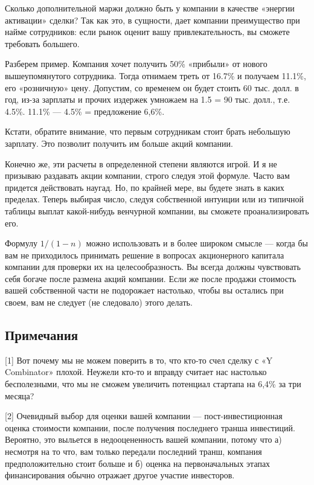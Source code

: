 \documentclass[ebook,12pt,oneside,openany]{memoir}
\begin{document}
Сколько дополнительной маржи должно быть у компании в качестве
«энергии активации» сделки? Так как это, в сущности, дает компании
преимущество при найме сотрудников: если рынок оценит вашу
привлекательность, вы сможете требовать большего. \newline

Разберем пример. Компания хочет получить 50\% «прибыли» от нового
вышеупомянутого сотрудника. Тогда отнимаем треть от 16.7\% и получаем
11.1\%, его «розничную» цену. Допустим, со временем он будет стоить 60
тыс. долл. в год, из-за зарплаты и прочих издержек умножаем на 1.5 =
90 тыс. долл., т.е. 4.5\%. 11.1\% — 4.5\% = предложение 6,6\%. \newline

Кстати, обратите внимание, что первым сотрудникам стоит брать
небольшую зарплату. Это позволит получить им больше акций компании. \newline

Конечно же, эти расчеты в определенной степени являются игрой. И я не
призываю раздавать акции компании, строго следуя этой формуле. Часто
вам придется действовать наугад. Но, по крайней мере, вы будете знать
в каких пределах. Теперь выбирая число, следуя собственной интуиции
или из типичной таблицы выплат какой-нибудь венчурной компании, вы
сможете проанализировать его. \newline

Формулу $1/(1 - n)$ можно использовать и в более широком смысле — когда
бы вам не приходилось принимать решение в вопросах акционерного
капитала компании для проверки их на целесообразность. Вы всегда
должны чувствовать себя богаче после размена акций компании. Если же
после продажи стоимость вашей собственной части не подорожает
настолько, чтобы вы остались при своем, вам не следует (не следовало)
этого делать.

\subsection{Примечания}

[1] Вот почему мы не можем поверить в то, что кто-то счел сделку с «Y
Combinator» плохой. Неужели кто-то и вправду считает нас настолько
бесполезными, что мы не сможем увеличить потенциал стартапа на 6,4\%
за три месяца? \newline

[2] Очевидный выбор для оценки вашей компании — пост-инвестиционная
оценка стоимости компании, после получения последнего транша
инвестиций. Вероятно, это выльется в недооцененность вашей компании,
потому что а) несмотря на то что, вам только передали последний транш,
компания предположительно стоит больше и б) оценка на первоначальных
этапах финансирования обычно отражает другое участие инвесторов. \newline
\end{document}
